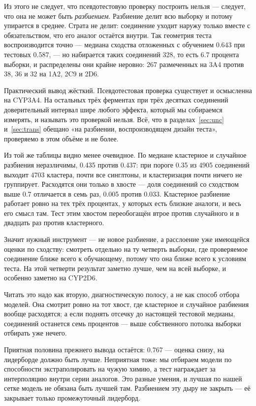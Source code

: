 Из этого не следует, что псевдотестовую проверку построить нельзя --- следует, что она не может быть
\emph{разбиением}. Разбиение делит всю выборку и потому упирается в среднее. Страта не делит: соединение
уходит наружу только вместе с обязательством, что его аналог остаётся внутри. Так геометрия теста
воспроизводится точно --- медиана сходства отложенных с обучением 0.643 при тестовых 0.587, --- но
набирается таких соединений 328, то есть 6.7 процента выборки, и распределены они крайне неровно:
267 размеченных на 3A4 против 38, 36 и 32 на 1A2, 2C9 и 2D6.

Практический вывод жёсткий. Псевдотестовая проверка существует и осмысленна на CYP3A4. На остальных
трёх ферментах при трёх десятках соединений доверительный интервал шире любого эффекта, который мы
собираемся измерять, и называть это проверкой нельзя. Всё, что в разделах~\ref{sec:unc}
и~\ref{sec:trans} обещано «на разбиении, воспроизводящем дизайн теста», проверяемо в этом объёме
и не более.

Из той же таблицы видно менее очевидное. По медиане кластерное и случайное разбиения неразличимы,
0.435 против 0.437: при пороге 0.35 из 4905 соединений выходит 4703 кластера, почти все синглтоны,
и кластеризация почти ничего не группирует. Расходятся они только в хвосте --- доля соединений со
сходством выше 0.7 отличается в семь раз, 0.005 против 0.033. Кластерное разбиение работает ровно
на тех трёх процентах, у которых есть близкие аналоги, и весь его смысл там. Тест этим хвостом
переобогащён втрое против случайного и в двадцать раз против кластерного.

Значит нужный инструмент --- не новое разбиение, а расслоение уже имеющейся оценки по сходству:
смотреть отдельно на ту четверть выборки, где проверяемое соединение ближе всего к обучающему,
потому что она ближе всего к условиям теста. На этой четверти результат заметно лучше, чем на
всей выборке, и особенно заметно на CYP2D6.

Читать это надо как вторую, диагностическую полосу, а не как способ отбора моделей. Она
смотрит ровно на тот хвост, где кластерное и случайное разбиения вообще расходятся; а если
поднять отсечку до настоящей тестовой медианы, соединений останется семь процентов --- выше
собственного потолка выборки отбирать уже нечего.

Приятная половина прежнего вывода остаётся: 0.767 --- оценка снизу, на лидерборде должно быть лучше.
Неприятная тоже: мы отбираем модели по способности экстраполировать на чужую химию, а тест награждает
за интерполяцию внутри серии аналогов. Это разные умения, и лучшая по нашей сетке модель не обязана
быть лучшей там. Разбиением эту дыру не закрыть --- её закрывает только промежуточный лидерборд.

